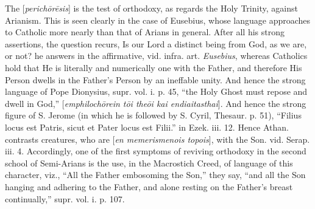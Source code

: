 The [\emph{perich\={o}r\={e}sis}] is the
test of orthodoxy, as regards the Holy Trinity, against Arianism. This
is seen clearly in the case of Eusebius, whose language approaches to
Catholic more nearly than that of Arians in general. After all his
strong assertions, the question recurs, Is our Lord a distinct being
from God, as we are, or not? he answers in the affirmative, vid. infra. art. \emph{Eusebius}, whereas Catholics hold that He is literally and numerically one
with the Father, and therefore His Person dwells in the Father's
Person by an ineffable unity. And hence the strong language of Pope
Dionysius, supr. vol. i. p. 45, ``the Holy Ghost must repose and dwell
in God,'' [\emph{emphiloch\={o}rein t\={o}i the\={o}i kai
endiaitasthai}]. And hence the strong figure of S. Jerome (in which
he is followed by S. Cyril, Thesaur. p. 51), ``Filius locus est Patris,
sicut et Pater locus est Filii.'' in Ezek. iii. 12. Hence Athan.
contrasts creatures, who are [\emph{en memerismenois topois}], with the
Son. vid. Serap. iii. 4. Accordingly, one of the first symptoms of
reviving orthodoxy in the second school of Semi-Arians is the use, in
the Macrostich Creed, of language of this character, viz., ``All the
Father embosoming the Son,'' they say, ``and all the Son hanging and
adhering to the Father, and alone resting on the Father's breast
continually,'' supr. vol. i. p. 107.


